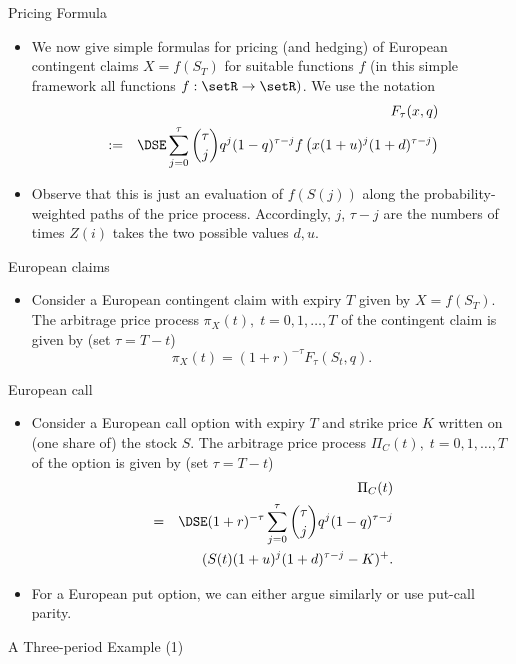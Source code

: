 {Pricing Formula}

\begin{itemize}
  \item We now give simple formulas for pricing (and hedging) of European
contingent claims $X=f(S_T)$ for suitable functions $f$ (in this
simple framework all functions $f:\setR \rightarrow \setR)$. We
use the notation
\begin{eqnarray}\label{BinomialF}
&& F_\tau(x,q)\\\nonumber
&:=&\DSE \sum_{j=0}^\tau {\tau \choose j} q^j (1-q)^{\tau-j}
f\left(x(1+u)^j(1+d)^{\tau-j}\right)
\end{eqnarray}
\item Observe that this is just an evaluation of $f(S(j))$ along the
probability-weighted paths of the price process. Accordingly, $j$,
$\tau-j$ are the numbers of times $Z(i)$ takes the two possible
values $d, u$.
\end{itemize}

{European claims}
\begin{itemize}
  \item Consider a European contingent claim with expiry $T$ given by
$X=f(S_T)$. The arbitrage price process $\pi_X(t), \; t=0, 1,
\ldots, T$ of the contingent claim is given by (set $\tau=T-t$)
\begin{equation}\label{crrcontclaimprice}
\pi_X(t) = (1+r)^{-\tau} F_\tau(S_t,q).
\end{equation}
\end{itemize}

{European call}
\begin{itemize}
  \item Consider a European call option with expiry $T$ and strike price
$K$ written on (one share of) the stock $S$. The arbitrage price
process $\Pi_C(t), \; t=0, 1, \ldots, T$ of the option is given by
(set $\tau=T-t$)
\begin{eqnarray}\label{crrcallprice}
&& \Pi_C(t)\\\nonumber
&=&\DSE (1+r)^{-\tau} \sum_{j=0}^{\tau} {{\tau} \choose j}
{q}^j (1 - q)^{\tau-j}\\\nonumber
&&(S(t) (1+u)^j (1+d)^{\tau-j} - K)^+.
\end{eqnarray}
\item For a European put option, we can either argue similarly or use
put-call parity.
\end{itemize}

{ A Three-period Example (1)}

